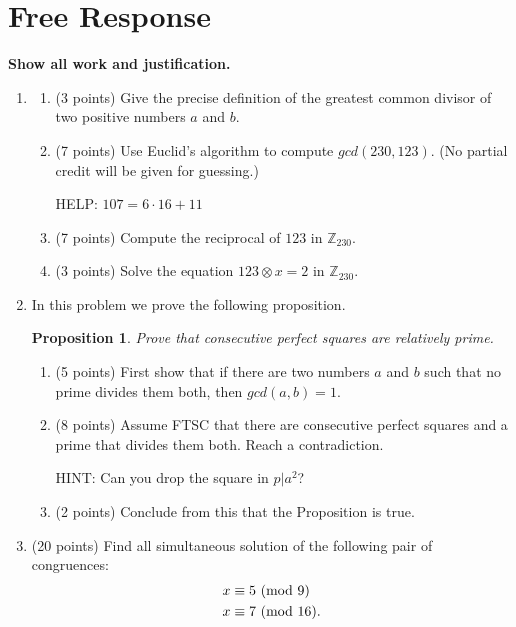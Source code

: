 \documentclass[12pt]{article}
\newtheorem*{proposition}{Proposition}
\begin{document}
\section*{Free Response}

\textbf{Show all work and justification.} 

\begin{enumerate}
\item 
\begin{enumerate}
\item (3 points) Give the precise definition of the greatest common divisor of two positive numbers $a$ and $b$.\vspace{3cm}
\item (7 points) Use Euclid's algorithm to compute $gcd(230,123)$. (No partial credit will be given for guessing.)

HELP: $107=6\cdot 16+11$
\vspace{5cm}
\item (7 points) Compute the reciprocal of $123$ in $\mathbb{Z}_{230}$. \vspace{5cm}
\item (3 points) Solve the equation $123\otimes x=2$ in $\mathbb{Z}_{230}$.\newpage

\end{enumerate}
\newpage
\item In this problem we prove the following proposition.
\begin{proposition}
 Prove that consecutive perfect squares are relatively prime.
\end{proposition}

\begin{enumerate}
\item (5 points) First show that if there are two numbers $a$ and $b$ such that no prime divides them both, then $gcd(a,b)=1$.
\item (8 points) Assume FTSC that there are consecutive perfect squares and a prime that divides them both. Reach a contradiction.

HINT: Can you drop the square in $p|a^2$?
\item (2 points) Conclude from this that the Proposition is true.
\end{enumerate}

\newpage
\item(20 points) Find all simultaneous solution of the following pair of congruences:
\begin{align*}
x&\equiv 5~({\rm mod}~9)\\
x&\equiv 7~({\rm mod}~16).
\end{align*}


\end{enumerate}
\end{document}
